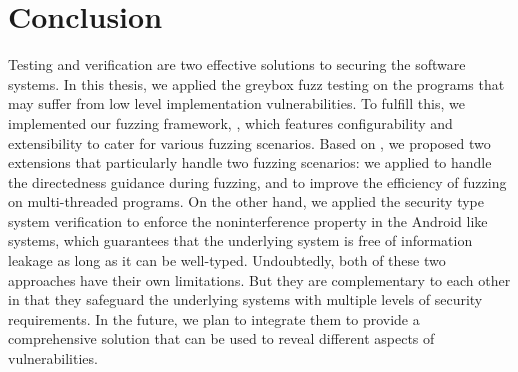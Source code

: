 
\chapter{Conclusion} \label{ch:conclusion}


Testing and verification are two effective solutions to securing the software systems. In this thesis, we applied the greybox fuzz testing on the programs that may suffer from low level implementation vulnerabilities. To fulfill this, we implemented our fuzzing framework, \FOT, which features configurability and extensibility to cater for various fuzzing scenarios. Based on \FOT, we proposed two extensions that particularly handle two fuzzing scenarios: we applied \dFOT to handle the directedness guidance during fuzzing, and \mtfuzz to improve the efficiency of fuzzing on multi-threaded programs. On the other hand, we applied the security type system verification to enforce the noninterference property in the Android like systems, which guarantees that the underlying system is free of information leakage as long as it can be well-typed. Undoubtedly, both of these two approaches have their own limitations. But they are complementary to each other in that they safeguard the underlying systems with multiple levels of security requirements. In the future, we plan to integrate them to provide a comprehensive solution that can be used to reveal different aspects of vulnerabilities.
